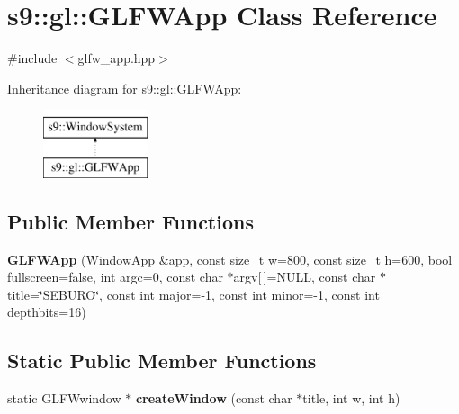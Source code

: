 \hypertarget{classs9_1_1gl_1_1GLFWApp}{\section{s9\-:\-:gl\-:\-:G\-L\-F\-W\-App Class Reference}
\label{classs9_1_1gl_1_1GLFWApp}
}


{\ttfamily \#include $<$glfw\-\_\-app.\-hpp$>$}

Inheritance diagram for s9\-:\-:gl\-:\-:G\-L\-F\-W\-App\-:\begin{figure}[H]
\begin{center}
\leavevmode
\includegraphics[height=2.000000cm]{classs9_1_1gl_1_1GLFWApp}
\end{center}
\end{figure}
\subsection*{Public Member Functions}
\begin{DoxyCompactItemize}
\item 
\hypertarget{classs9_1_1gl_1_1GLFWApp_a1f6e231130c4731c20d98207b7deda8d}{{\bfseries G\-L\-F\-W\-App} (\hyperlink{classs9_1_1WindowApp}{Window\-App} \&app, const size\-\_\-t w=800, const size\-\_\-t h=600, bool fullscreen=false, int argc=0, const char $\ast$argv\mbox{[}$\,$\mbox{]}=N\-U\-L\-L, const char $\ast$title=\char`\"{}S\-E\-B\-U\-R\-O\char`\"{}, const int major=-\/1, const int minor=-\/1, const int depthbits=16)}\label{classs9_1_1gl_1_1GLFWApp_a1f6e231130c4731c20d98207b7deda8d}

\end{DoxyCompactItemize}
\subsection*{Static Public Member Functions}
\begin{DoxyCompactItemize}
\item 
\hypertarget{classs9_1_1gl_1_1GLFWApp_a0b5b32a2b20b7ce8eeaf4afd3094eae4}{static G\-L\-F\-Wwindow $\ast$ {\bfseries create\-Window} (const char $\ast$title, int w, int h)}\label{classs9_1_1gl_1_1GLFWApp_a0b5b32a2b20b7ce8eeaf4afd3094eae4}

\end{DoxyCompactItemize}
